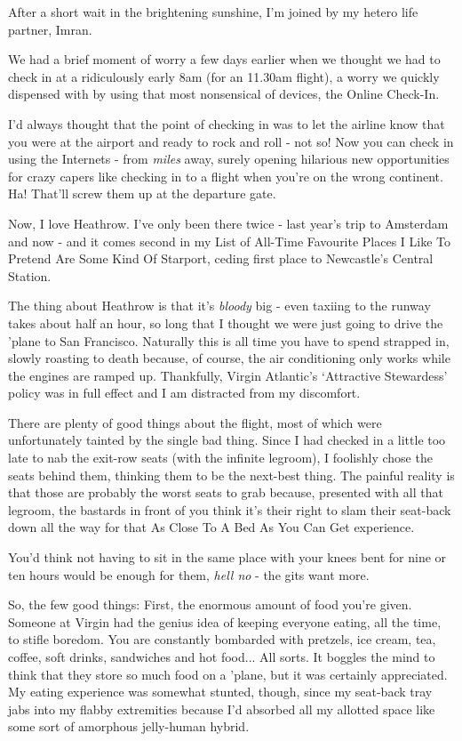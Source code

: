 \documentclass[a5paper,titlepage,11pt]{book}
\begin{document}
After a short wait in the brightening sunshine, I'm joined by my hetero life partner, Imran.

We had a brief moment of worry a few days earlier when we thought we had to check in at a ridiculously early 8am (for an 11.30am flight), a worry we quickly dispensed with by using that most nonsensical of devices, the Online Check-In.

I'd always thought that the point of checking in was to let the airline know that you were at the airport and ready to rock and roll - not so!  Now you can check in using the Internets - from \emph{miles} away, surely opening hilarious new opportunities for crazy capers like checking in to a flight when you're on the wrong continent.  Ha!  That'll screw them up at the departure gate.

Now, I love Heathrow.  I've only been there twice - last year's trip to Amsterdam and now - and it comes second in my List of All-Time Favourite Places I Like To Pretend Are Some Kind Of Starport, ceding first place to Newcastle's Central Station.

The thing about Heathrow is that it's \emph{bloody} big - even taxiing to the runway takes about half an hour, so long that I thought we were just going to drive the 'plane to San Francisco.  Naturally this is all time you have to spend strapped in, slowly roasting to death because, of course, the air conditioning only works while the engines are ramped up.  Thankfully, Virgin Atlantic's `Attractive Stewardess' policy was in full effect and I am distracted from my discomfort.

There are plenty of good things about the flight, most of which were unfortunately tainted by the single bad thing.  Since I had checked in a little too late to nab the exit-row seats (with the infinite legroom), I foolishly chose the seats behind them, thinking them to be the next-best thing.   The painful reality is that those are probably the worst seats to grab because, presented with all that legroom, the bastards in front of you think it's their right to slam their seat-back down all the way for that As Close To A Bed As You Can Get experience.

You'd think not having to sit in the same place with your knees bent for nine or ten hours would be enough for them, \emph{hell no} - the gits want more.

So, the few good things:  First, the enormous amount of food you're given.  Someone at Virgin had the genius idea of keeping everyone eating, all the time, to stifle boredom.  You are constantly bombarded with pretzels, ice cream, tea, coffee, soft drinks, sandwiches and hot food...  All sorts.  It boggles the mind to think that they store so much food on a 'plane, but it was certainly appreciated.  My eating experience was somewhat stunted, though, since my seat-back tray jabs into my flabby extremities because I'd absorbed all my allotted space like some sort of amorphous jelly-human hybrid.
\end{document}
